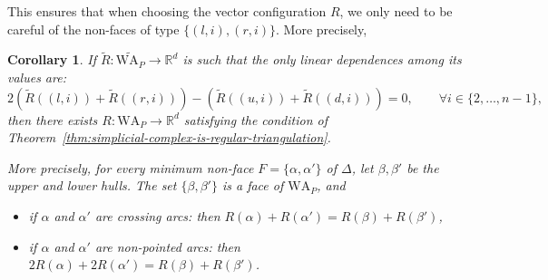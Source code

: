 \documentclass{amsart}
\newtheorem{corollary}[theorem]{Corollary}
\theoremstyle{definition}
\newcommand{\R}{\mathbb{R}} %
\newcommand{\pth}[1]{\left( #1 \right)} %
\newcommand{\wigglyArcs}{\mathrm{WA}} %
\begin{document}
This ensures that when choosing the vector configuration $R$, we only need to be careful of the non-faces of type $\{(l,i),(r,i)\}$. More precisely,
\begin{corollary}
\label{c:extension}
If $\widetilde R:\widetilde {\wigglyArcs_P}\to \R^d$ is such that the only linear dependences among its values are:
\[
2\pth{\widetilde R((l,i))+\widetilde R((r,i))} - \pth{\widetilde R((u,i))+\widetilde R((d,i))}=0, \qquad \forall i\in\{2,\ldots,n-1\},
\]
then there exists $R:\wigglyArcs_P\to \R^d$ satisfying the condition of Theorem~\ref{thm:simplicial-complex-is-regular-triangulation}. 

More precisely, for every minimum non-face $F=\{\alpha,\alpha'\}$ of $\Delta$, let $\beta, \beta'$ be the upper and lower hulls. The set $\{\beta,\beta'\}$ is a face of $\wigglyArcs_P$, and
    \begin{itemize}
    \item if $\alpha$ and $\alpha'$ are crossing arcs: then $R(\alpha)+R(\alpha')=R(\beta)+R(\beta')$,
    \item if $\alpha$ and $\alpha'$ are non-pointed arcs: then $2R(\alpha)+2R(\alpha')=R(\beta)+R(\beta')$.
    \end{itemize}
\end{corollary}
\end{document}
